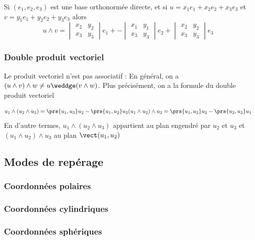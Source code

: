 \begin{proposition}
Si $(e_1,e_2,e_3)$ est une base orthonormée directe, et si $u =x_1e_1+x_2e_2 + x_3e_3 $ et $v =y_1e_1+y_2e_2 + y_3e_3 $ alors
\[
		u \wedge v =
		\begin{vmatrix}
			x_2 & y_2\\
			x_3 & y_3
		\end{vmatrix} e_1 +
		-\begin{vmatrix}
			x_1 & y_1\\
			x_3 & y_3
		\end{vmatrix} e_2 + 
			\begin{vmatrix}
			x_2 & y_2\\
			x_3 & y_3
		\end{vmatrix} e_3
\]


\end{proposition}

\subsubsection{Double produit vectoriel}

Le produit vectoriel n'est pas associatif : 
En général, on a $(u\wedge v) \wedge w \neq u\weddge (v\wedge w)$. Plus précisément, on a la formule du double produit vectoriel
			
\begin{align*}
	u_1 \wedge (u_2 \wedge u_3) = \prs{u_1,u_3} u_2 - \prs{u_1,u_2} u_3
	(u_1 \wedge u_2) \wedge u_3 = \prs{u_1,u_3} u_2 -\prs{u_2,u_3} u_1
\end{align*}
En d'autre termes, $u_1 \wedge (u_2 \wedge u_3) $ appartient au plan engendré par $u_2$ et $u_3$ et $(u_1 \wedge u_2) \wedge u_3$ au plan $\vect(u_1,u_2)$


\subsection{Modes de repérage}

\subsubsection{Coordonnées polaires}

\subsubsection{Coordonnées cylindriques}

\subsubsection{Coordonnées sphériques}


